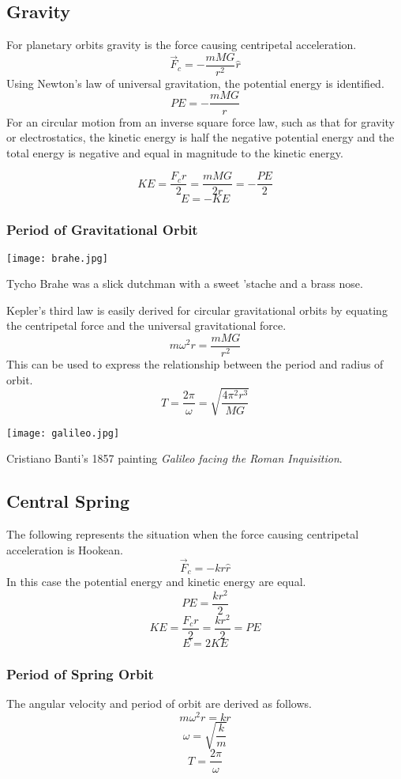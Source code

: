 \subsection{Gravity}
For planetary orbits gravity is the force causing centripetal acceleration.  
$$\overrightarrow{F}_c=-\frac{mMG}{r^2}\hat{r}$$
Using Newton's law of universal gravitation, the potential energy is identified.
$$PE=-\frac{mMG}{r}$$
For an circular motion from an inverse square force law, such as that for gravity or electrostatics, the kinetic energy is half the negative potential energy and the total energy is negative and equal in magnitude to the kinetic energy.
 
$$KE=\frac{F_cr}{2}=\frac{mMG}{2r}=-\frac{PE}{2}$$
$$E=-KE$$
\subsubsection{Period of Gravitational Orbit}
\begin{marginfigure}[0pt]
  \texttt{[image: brahe.jpg]}
  \caption{Tycho Brahe was a slick dutchman with a sweet 'stache and a brass nose.}
  \label{fig:marginfig}
\end{marginfigure}
Kepler's third law is easily derived for circular gravitational orbits by equating the centripetal force and the universal gravitational force.
$$m\omega^2r=\frac{mMG}{r^2}$$
This can be used to express the relationship between the period and radius of orbit.
$$T=\frac{2\pi}{\omega}=\sqrt{\frac{4\pi^2 r^3}{MG}}$$


\newpage

\begin{marginfigure}[0pt]
  \texttt{[image: galileo.jpg]}
  
  \caption{Cristiano Banti's 1857 painting \textit{Galileo facing the Roman Inquisition}.}
  \label{fig:marginfig}
\end{marginfigure}
\subsection{Central Spring}
The following represents the situation when the force causing centripetal acceleration is Hookean.  
$$\overrightarrow{F}_c=-kr\hat{r}$$
In this case the potential energy and kinetic energy are equal.
$$PE=\frac{kr^2}{2}$$
$$KE=\frac{F_cr}{2}=\frac{kr^2}{2}=PE$$
$$E=2KE$$
\subsubsection{Period of Spring Orbit}
The angular velocity and period of orbit are derived as follows.
$$m\omega^2r=kr$$
$$\omega=\sqrt{\frac{k}{m}}$$
$$T=\frac{2\pi}{\omega}$$


